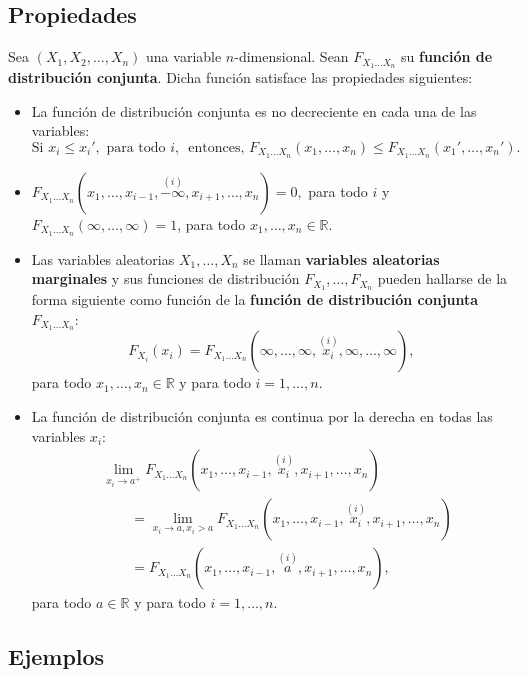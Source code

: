 \documentclass[]{book}
\begin{document}
\hypertarget{propiedades-5}{%
\subsection{Propiedades}\label{propiedades-5}}

Sea \((X_1,X_2,\ldots,X_n)\) una variable \(n\)-dimensional. Sean \(F_{X_1\ldots X_n}\) su \textbf{función de distribución conjunta}. Dicha función satisface las propiedades siguientes:

\begin{itemize}
\item
  La función de distribución conjunta es no decreciente en cada una de las variables:
  \[
  \mbox{Si }x_i\leq x_i', \mbox{ para todo $i$, }\mbox{ entonces, }F_{X_1\ldots X_n}(x_1,\ldots,x_n)\leq F_{X_1\ldots X_n}(x_1',\ldots,x_n').
  \]
\item
  \(F_{X_1\ldots X_n}(x_1,\ldots,x_{i-1},\stackrel{(i)}{-\infty},x_{i+1},\ldots,x_n)=0,\) para todo \(i\) y \(F_{X_1\ldots X_n}(\infty,\ldots,\infty)=1\), para todo \(x_1,\ldots,x_n\in\mathbb{R}\).
\item
  Las variables aleatorias \(X_1,\ldots, X_n\) se llaman \textbf{variables aleatorias marginales} y sus funciones de distribución \(F_{X_1},\ldots, F_{X_n}\) pueden hallarse de la forma siguiente como función de la \textbf{función de distribución conjunta} \(F_{X_1\ldots X_n}\):
  \[
  F_{X_i}(x_i)=F_{X_1\ldots X_n}(\infty,\ldots,\infty,\stackrel{(i)}{x_i},\infty,\ldots,\infty),
  \]
  para todo \(x_1,\ldots,x_n\in\mathbb{R}\) y para todo \(i=1,\ldots,n\).
\item
  La función de distribución conjunta es continua por la derecha en todas las variables \(x_i\):
  \[
  \begin{array}{rl}
   & \lim\limits_{x_i\to a^+}F_{X_1\ldots X_n}(x_1,\ldots,x_{i-1},\stackrel{(i)}{x_i},x_{i+1},\ldots,x_n) \\ &\qquad =\lim\limits_{x_i\to a, x_i> a}F_{X_1\ldots X_n}(x_1,\ldots,x_{i-1},\stackrel{(i)}{x_i},x_{i+1},\ldots,x_n)\\ &\qquad =F_{X_1\ldots X_n}(x_1,\ldots,x_{i-1},\stackrel{(i)}{a},x_{i+1},\ldots,x_n),
  \end{array}
  \]
  para todo \(a\in\mathbb{R}\) y para todo \(i=1,\ldots,n\).
\end{itemize}

\hypertarget{ejemplos-14}{%
\subsection{Ejemplos}\label{ejemplos-14}}
\end{document}
